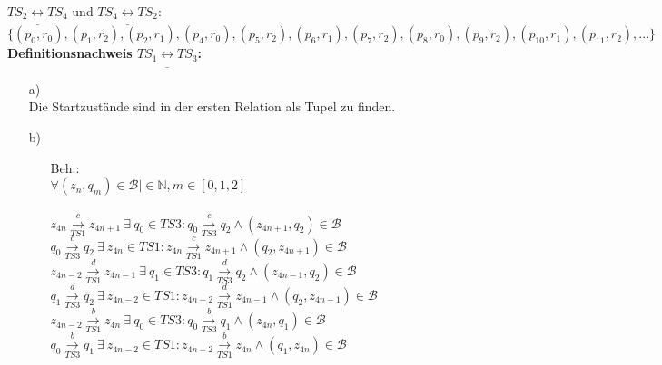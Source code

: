 \documentclass[a4paper,11pt,fleqn]{scrartcl}
\begin{document}
\begin{enumerate}
    	\(TS_2\underline{\leftrightarrow}TS_4\) und \(TS_4\underline{\leftrightarrow}TS_2:\) \\
	    \(
	    \big\{(p_0,r_0),(p_1,r_2),(p_2,r_1),(p_4,r_0),(p_5,r_2),(p_6,r_1),(p_7,r_2),(p_8,r_0),(p_9,r_2),
    		(p_{10},r_1),(p_{11},r_2),...\big\}
	    \) \\ \newpage
	    \textbf{Definitionsnachweis \(TS_1\underline{\leftrightarrow}TS_3\):}
	    \begin{enumerate}
	    	\item[a)]\quad \\
	    		Die Startzustände sind in der ersten Relation als Tupel zu finden.
	    	\item[b)]\quad \\
            \begin{enumerate}
				\item[Beh.:]\quad \\
                \(\forall (z_n,q_m)\in \mathcal{B} |\in \mathbb{N}, m\in[0,1,2] \)\\ \\
					\(z_{4n}\overset{c}{\underset{TS1}{\rightarrow}}z_{4n+1}\ \exists\ q_0 \in 
					TS3:q_0\overset{c}{\underset{TS3}{\rightarrow}}q_2 \land (z_{4n+1},q_2)\in \mathcal{B}\) \\
					
					\(q_0\overset{c}{\underset{TS3}{\rightarrow}}q_2\ \exists\ z_{4n} \in 
					TS1:z_{4n}\overset{c}{\underset{TS1}{\rightarrow}}z_{4n+1} \land (q_2,z_{4n+1})\in
					\mathcal{B}\) \\
					
					\(z_{4n-2}\overset{d}{\underset{TS1}{\rightarrow}}z_{4n-1}\ \exists\ q_1 \in 
					TS3:q_1\overset{d}{\underset{TS3}{\rightarrow}}q_2 \land (z_{4n-1},q_2)\in \mathcal{B}\) \\
					
					\(q_1\overset{d}{\underset{TS3}{\rightarrow}}q_2\ \exists\ z_{4n-2} \in 
					TS1:z_{4n-2}\overset{d}{\underset{TS1}{\rightarrow}}z_{4n-1} \land (q_2,z_{4n-1})\in
					\mathcal{B}\) \\
					
					\(z_{4n-2}\overset{b}{\underset{TS1}{\rightarrow}}z_{4n}\ \exists\ q_0 \in 
					TS3:q_0\overset{b}{\underset{TS3}{\rightarrow}}q_1 \land (z_{4n},q_1)\in \mathcal{B}\) \\
					
					\(q_0\overset{b}{\underset{TS3}{\rightarrow}}q_1\ \exists\ z_{4n-2} \in 
					TS1:z_{4n-2}\overset{b}{\underset{TS1}{\rightarrow}}z_{4n} \land (q_1,z_{4n})\in
					\mathcal{B}\) \\
					

\end{enumerate}
\end{enumerate}
\end{enumerate}
\end{document}
